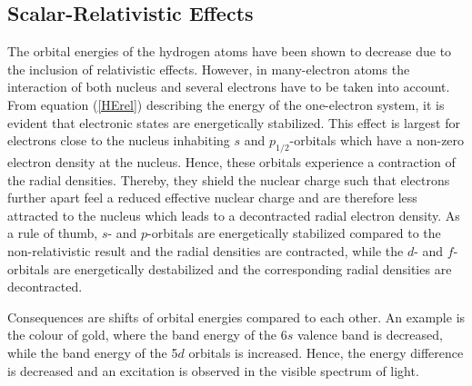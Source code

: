 \subsection{Scalar-Relativistic Effects}
The orbital energies of the hydrogen atoms have been shown to decrease
due to the inclusion of relativistic effects. However, in many-electron
atoms the interaction of both nucleus and several electrons have to be taken
into account. From equation (\ref{HErel}) describing the energy of the
one-electron system, it is evident that
electronic states are energetically stabilized. This effect is largest
for electrons close to the nucleus inhabiting $s$ and
$p_{1/2}$-orbitals which
have a non-zero electron density at the nucleus. Hence, these orbitals
experience a contraction of the radial densities. Thereby, they shield the
nuclear charge such 
that electrons further apart feel a reduced effective nuclear charge and
are therefore less attracted to the nucleus which leads to a decontracted
radial electron density.
As a rule of thumb, $s$- and $p$-orbitals
are energetically stabilized compared to the non-relativistic result
and the radial densities are contracted, while
the $d$- and $f$-orbitals are energetically destabilized
and the corresponding radial densities are decontracted.

Consequences are shifts of orbital energies compared to each other. An example
is the colour of gold, where the band energy of the 6$s$ valence band is
decreased, while the band energy of the 5$d$ orbitals is increased. Hence,
the energy difference is decreased and an excitation is observed in the
visible spectrum of light.
